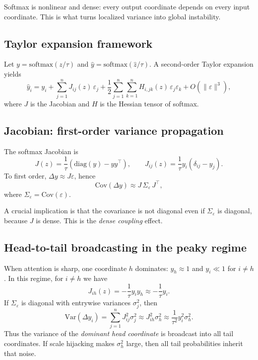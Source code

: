 Softmax is nonlinear and dense: every output coordinate depends on every input coordinate.
This is what turns localized variance into global instability.

\subsection{Taylor expansion framework}

Let $y=\mathrm{softmax}(z/\tau)$ and $\hat y=\mathrm{softmax}(\hat z/\tau)$.
A second-order Taylor expansion yields
\begin{equation}
\hat y_i
=
y_i
+
\sum_{j=1}^{n} J_{ij}(z)\,\varepsilon_j
+
\frac12 \sum_{j=1}^{n}\sum_{k=1}^{n} H_{i,jk}(z)\,\varepsilon_j\varepsilon_k
+
O(\|\varepsilon\|^3),
\label{eq:taylor_softmax_ch1}
\end{equation}
where $J$ is the Jacobian and $H$ is the Hessian tensor of softmax.

\subsection{Jacobian: first-order variance propagation}

The softmax Jacobian is
\begin{equation}
J(z)
=
\frac{1}{\tau}\left(\mathrm{diag}(y)-yy^\top\right),
\qquad
J_{ij}(z)=\frac{1}{\tau}y_i(\delta_{ij}-y_j).
\label{eq:softmax_jac_ch1}
\end{equation}
To first order, $\Delta y \approx J\varepsilon$, hence
\begin{equation}
\mathrm{Cov}(\Delta y)\approx J\,\Sigma_\varepsilon\,J^\top,
\label{eq:cov_prop_ch1}
\end{equation}
where $\Sigma_\varepsilon=\mathrm{Cov}(\varepsilon)$.

A crucial implication is that the covariance is not diagonal even if $\Sigma_\varepsilon$
is diagonal, because $J$ is dense. This is the \emph{dense coupling} effect.

\subsection{Head-to-tail broadcasting in the peaky regime}

When attention is sharp, one coordinate $h$ dominates: $y_h\approx 1$ and $y_i\ll 1$ for $i\neq h$.
In this regime, for $i\neq h$ we have
\begin{equation}
J_{ih}(z)= -\frac{1}{\tau}y_i y_h \approx -\frac{1}{\tau}y_i.
\end{equation}
If $\Sigma_\varepsilon$ is diagonal with entrywise variances $\sigma_j^2$, then
\begin{equation}
\mathrm{Var}(\Delta y_i)
=
\sum_{j=1}^{n}J_{ij}^2\sigma_j^2
\approx
J_{ih}^2\sigma_h^2
\approx
\frac{1}{\tau^2}y_i^2\sigma_h^2.
\label{eq:head_tail_broadcast_ch1}
\end{equation}
Thus the variance of the \emph{dominant head coordinate} is broadcast into all tail coordinates.
If scale hijacking makes $\sigma_h^2$ large, then all tail probabilities inherit that noise.

